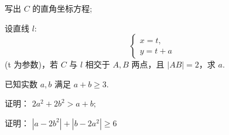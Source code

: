 \documentclass[UTF8,12pt]{ctexart}
\begin{document}
\begin{questions}[start=17]
    \begin{subquestions}
      \item
      写出 $C$ 的直角坐标方程;
      \item
      设直线 $l:$ \[\begin{cases}x=t, \\y=t+a\end{cases}\] (t 为参数)，若 $C$ 与 $l$
        相交于 $A, B$ 两点，且 $|AB|=2$，求 $a$.
    \end{subquestions}

  \item 已知实数 $a, b$ 满足 $a + b \geqslant 3$.

    \begin{subquestions}
      \item
      证明： $2a^{2}+2b^{2}>a+b;$
      \item
      证明： $\left|a-2b^{2}\right|+\left|b-2a^{2}\right|\geqslant6$
    \end{subquestions}

\end{questions}
\end{document}

